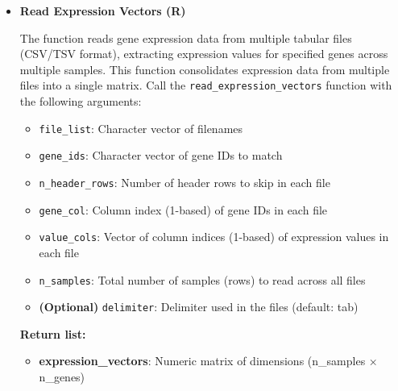 \documentclass[11pt]{article}
\begin{document}
\begin{enumerate}
\begin{itemize}
	      	      \begin{lstlisting}[language=R, caption={R Read Gene IDs from TSV File}]
read_gene_ids_from_tsv_file(filename, ngenes, gene_len, 
    n_header_rows = 1, gene_col = 1)
	      	      \end{lstlisting}
	      	      
	      	\item \textbf{Read Expression Vectors (R)}
	      	      
	      	      The function reads gene expression data from multiple tabular files (CSV/TSV
	      	      format), extracting expression values for specified genes across multiple
	      	      samples. This function consolidates expression data from multiple files into
	      	      a single matrix. Call the \texttt{read\_expression\_vectors} function with
	      	      the following arguments:
	      	      
	      	      \begin{itemize}
	      	      	\item \texttt{file\_list}: Character vector of filenames
	      	      	      
	      	      	\item \texttt{gene\_ids}: Character vector of gene IDs to match
	      	      	      
	      	      	\item \texttt{n\_header\_rows}: Number of header rows to skip in each file
	      	      	      
	      	      	\item \texttt{gene\_col}: Column index (1-based) of gene IDs in each file
	      	      	      
	      	      	\item \texttt{value\_cols}: Vector of column indices (1-based) of expression
	      	      	      values in each file
	      	      	      
	      	      	\item \texttt{n\_samples}: Total number of samples (rows) to read across
	      	      	      all files
	      	      	      
	      	      	\item \textbf{(Optional)} \texttt{delimiter}: Delimiter used in the
	      	      	      files (default: tab)
	      	      \end{itemize}
	      	      
	      	      \textbf{Return list:}
	      	      \begin{itemize}
	      	      	\item \textbf{expression\_vectors}: Numeric matrix of dimensions (n\_samples
	      	      	      × n\_genes)
	      	      	      

\end{itemize}
\end{itemize}
\end{enumerate}
\end{document}
